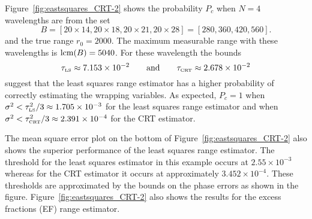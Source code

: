 Figure~\ref{fig:eastsquares_CRT-2} shows the probability $P_c$ when $N=4$ wavelengths are from the set
\[
B = [20\times14, 20\times18, 20\times21, 20\times28] = [280,   360,   420,   560].
\]
and the true range $r_0 = 2000$. The maximum measurable range with these wavelengths is $\operatorname{lcm}(B) = 5040$. For these wavelength the bounds 
\[
\tau_{\text{\tiny{LS}}} \approx 7.153 \times 10^{-2} \qquad \text{and} \qquad \tau_{\text{\tiny{CRT}}} \approx 2.678 \times 10^{-2}
\]
suggest that the least squares range estimator has a higher probability of correctly estimating the wrapping variables. As expected, $P_c = 1$ when $\sigma^2 < \tau_{\text{\tiny{LS}}}^2/3 \approx 1.705 \times 10^{-3} $ for the least squares range estimator and when $\sigma^2 < \tau_{\text{\tiny{CRT}}}^2/3 \approx 2.391 \times 10^{-4}$ for the CRT estimator.  %

The mean square error plot on the bottom of  Figure~\ref{fig:eastsquares_CRT-2} also shows the superior performance of the least squares range estimator. The threshold for the least squares estimator in this example occurs at $2.55\times 10^{-3}$ whereas for the CRT estimator it occurs at approximately $ 3.452\times 10^{-4}$. These thresholds are approximated by the bounds on the phase errors as shown in the figure. Figure~\ref{fig:eastsquares_CRT-2} also shows the results for the excess fractions (EF) range estimator.




